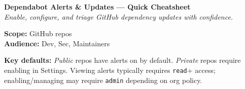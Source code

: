 \documentclass[11pt,letterpaper]{article}
\begin{document}
\begin{minipage}{0.72\linewidth}
  {\huge\bfseries Dependabot Alerts \& Updates — Quick Cheatsheet}\\[2pt]
  \textit{Enable, configure, and triage GitHub dependency updates with confidence.}
\end{minipage}
\hfill
\begin{minipage}{0.25\linewidth}
  \raggedleft \small
  \textbf{Scope:} GitHub repos \\
  \textbf{Audience:} Dev, Sec, Maintainers
\end{minipage}

\vspace{6pt}
\begin{ghascallout}
\textbf{Key defaults:} \emph{Public} repos have alerts on by default. \emph{Private} repos require enabling in Settings. Viewing alerts typically requires \texttt{read}+ access; enabling/managing may require \texttt{admin} depending on org policy.
\end{ghascallout}
\end{document}

